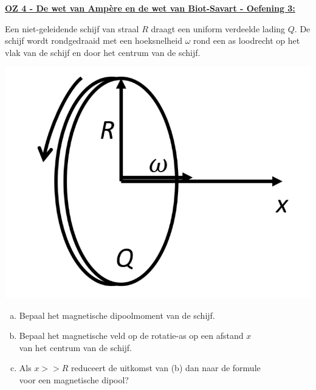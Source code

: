 \textbf{\underline{OZ 4 - De wet van Ampère en de wet van Biot-Savart - Oefening 3:}}
\vspace{0.5cm}

\begin{minipage}{0.7\textwidth}
    \vspace{-2cm}
    Een niet-geleidende schijf van straal $R$ draagt een uniform verdeelde lading $Q$. De schijf wordt rondgedraaid met een hoeksnelheid $\omega$ rond een as loodrecht op het vlak
    van de schijf en door het centrum van de schijf.
\end{minipage}
\begin{minipage}{0.26\textwidth}
    \includegraphics[scale = 0.3]{oz04/resources/Oz4Oef3.png}
\end{minipage}

\vspace{-2cm}


\begin{enumerate}[(a)]
    \item Bepaal het magnetische dipoolmoment van de schijf.
    \item Bepaal het magnetische veld op de rotatie-as op een afstand $x$ 
          \\ van het centrum van de schijf.
    \item Als $x >> R$ reduceert de uitkomst van (b) dan naar de formule
          \\ voor een magnetische dipool?
\end{enumerate}

